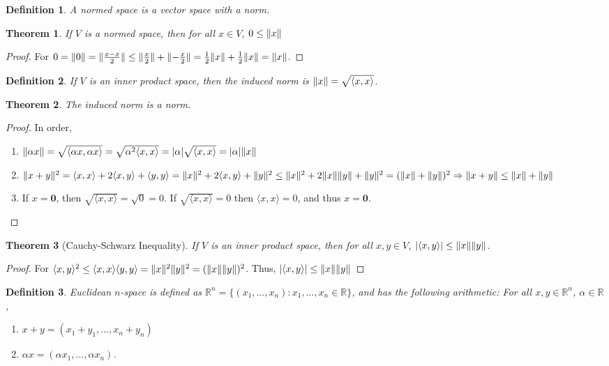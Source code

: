 \documentclass[crop=false,class=book]{standalone}
\theoremstyle{mystyle}
\newtheorem{theorem}{Theorem}[section]
\newtheorem{definition}{Definition}[section]
\DeclarePairedDelimiter\norm{\lVert}{\rVert}
\begin{document}
\begin{definition}
A normed space is a vector space with a norm.
\end{definition}
\begin{theorem}
If $V$ is a normed space, then for all $x\in V$, $0\leq \norm{x}$
\end{theorem}
\begin{proof}
For $0=\norm{0} = \norm{\frac{x-x}{2}} \leq \norm{\frac{x}{2}}+\norm{-\frac{x}{2}} = \frac{1}{2}\norm{x} + \frac{1}{2}\norm{x} = \norm{x}$.
\end{proof}
\begin{definition}
If $V$ is an inner product space, then the induced norm is $\norm{x}=\sqrt{\langle x,x \rangle}$.
\end{definition}
\begin{theorem}
The induced norm is a norm.
\end{theorem}
\begin{proof}
In order,
\begin{enumerate}
\item $\norm{\alpha x} = \sqrt{\langle \alpha x, \alpha x \rangle} = \sqrt{\alpha^2 \langle x,x\rangle} = |\alpha| \sqrt{\langle x,x \rangle} = |\alpha| \norm{x}$
\item $\norm{x+y}^2= \langle x,x \rangle + 2\langle x,y \rangle + \langle y,y \rangle = \norm{x}^2 + 2\langle x,y \rangle + \norm{y}^2 \leq \norm{x}^2 +2\norm{x}\norm{y} + \norm{y}^2 = (\norm{x}+\norm{y})^2\Rightarrow \norm{x+y}\leq \norm{x}+\norm{y}$
\item If $x= \mathbf{0}$, then $\sqrt{\langle x,x \rangle} = \sqrt{0} = 0$. If $\sqrt{\langle x,x \rangle} = 0$ then $\langle x,x \rangle = 0$, and thus $x = \mathbf{0}$.
\end{enumerate}
\end{proof}
\begin{theorem}[Cauchy-Schwarz Inequality]
If $V$ is an inner product space, then for all $x,y \in V$, $|\langle x,y\rangle| \leq \norm{x} \norm{y}$.
\end{theorem}
\begin{proof}
For $\langle x,y \rangle^2 \leq \langle x,x \rangle \langle y,y \rangle = \norm{x}^2 \norm{y}^2 = (\norm{x}\norm{y})^2$. Thus, $|\langle x,y \rangle| \leq \norm{x}\norm{y}$
\end{proof}
\begin{definition}
Euclidean $n$-space is defined as $\mathbb{R}^n=\{(x_1,\hdots, x_n):x_1,\hdots, x_n \in \mathbb{R}\}$, and has the following arithmetic: For all $x,y\in \mathbb{R}^n$, $\alpha \in \mathbb{R}$,
\begin{enumerate}
\item $x+y = (x_1+y_1,\hdots, x_n+y_n)$
\item $\alpha x = (\alpha x_1,\hdots, \alpha x_n)$.
\end{enumerate}
\end{definition}
\end{document}
